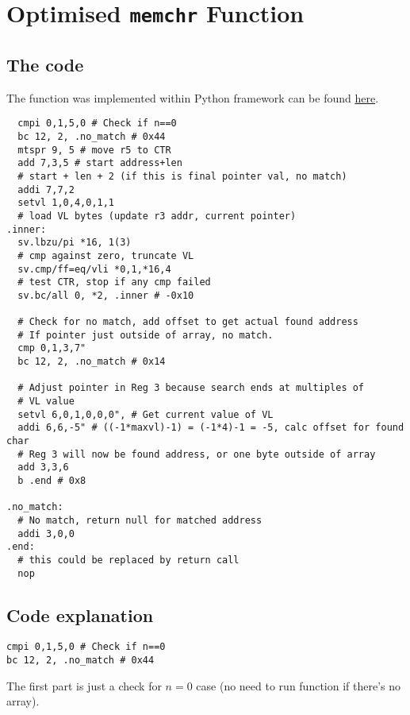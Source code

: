%

\section{Optimised \texttt{memchr} Function}

\subsection{The code}

The function was implemented within Python framework can be found
\href{https://git.vantosh.com/ngisearch/glibc-svp64/src/commit/fd6de0a7fd050230eaf891abfd510ca83cd8ab62/svp64-port/optimised_variants/test_memchr.py}{here}.
\begin{verbatim}
  cmpi 0,1,5,0 # Check if n==0
  bc 12, 2, .no_match # 0x44
  mtspr 9, 5 # move r5 to CTR
  add 7,3,5 # start address+len
  # start + len + 2 (if this is final pointer val, no match)
  addi 7,7,2
  setvl 1,0,4,0,1,1
  # load VL bytes (update r3 addr, current pointer)
.inner:
  sv.lbzu/pi *16, 1(3)
  # cmp against zero, truncate VL
  sv.cmp/ff=eq/vli *0,1,*16,4
  # test CTR, stop if any cmp failed
  sv.bc/all 0, *2, .inner # -0x10

  # Check for no match, add offset to get actual found address
  # If pointer just outside of array, no match.
  cmp 0,1,3,7"
  bc 12, 2, .no_match # 0x14

  # Adjust pointer in Reg 3 because search ends at multiples of
  # VL value
  setvl 6,0,1,0,0,0", # Get current value of VL
  addi 6,6,-5" # ((-1*maxvl)-1) = (-1*4)-1 = -5, calc offset for found char
  # Reg 3 will now be found address, or one byte outside of array
  add 3,3,6
  b .end # 0x8

.no_match:
  # No match, return null for matched address
  addi 3,0,0
.end:
  # this could be replaced by return call
  nop
\end{verbatim}

\subsection{Code explanation}
\begin{verbatim}
cmpi 0,1,5,0 # Check if n==0
bc 12, 2, .no_match # 0x44
\end{verbatim}
The first part is just a check for $n=0$ case (no need to run function if
there's no array).

